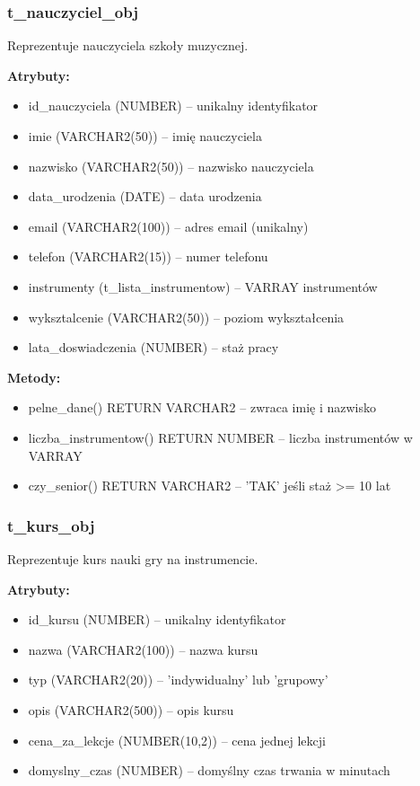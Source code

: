 \documentclass[12pt,a4paper]{article}
\begin{document}
\subsubsection{t\_nauczyciel\_obj}
Reprezentuje nauczyciela szkoły muzycznej.

\textbf{Atrybuty:}
\begin{itemize}[nosep]
    \item id\_nauczyciela (NUMBER) -- unikalny identyfikator
    \item imie (VARCHAR2(50)) -- imię nauczyciela
    \item nazwisko (VARCHAR2(50)) -- nazwisko nauczyciela
    \item data\_urodzenia (DATE) -- data urodzenia
    \item email (VARCHAR2(100)) -- adres email (unikalny)
    \item telefon (VARCHAR2(15)) -- numer telefonu
    \item instrumenty (t\_lista\_instrumentow) -- VARRAY instrumentów
    \item wyksztalcenie (VARCHAR2(50)) -- poziom wykształcenia
    \item lata\_doswiadczenia (NUMBER) -- staż pracy
\end{itemize}

\textbf{Metody:}
\begin{itemize}[nosep]
    \item pelne\_dane() RETURN VARCHAR2 -- zwraca imię i nazwisko
    \item liczba\_instrumentow() RETURN NUMBER -- liczba instrumentów w VARRAY
    \item czy\_senior() RETURN VARCHAR2 -- 'TAK' jeśli staż >= 10 lat
\end{itemize}

\subsubsection{t\_kurs\_obj}
Reprezentuje kurs nauki gry na instrumencie.

\textbf{Atrybuty:}
\begin{itemize}[nosep]
    \item id\_kursu (NUMBER) -- unikalny identyfikator
    \item nazwa (VARCHAR2(100)) -- nazwa kursu
    \item typ (VARCHAR2(20)) -- 'indywidualny' lub 'grupowy'
    \item opis (VARCHAR2(500)) -- opis kursu
    \item cena\_za\_lekcje (NUMBER(10,2)) -- cena jednej lekcji
    \item domyslny\_czas (NUMBER) -- domyślny czas trwania w minutach
\end{itemize}
\end{document}
